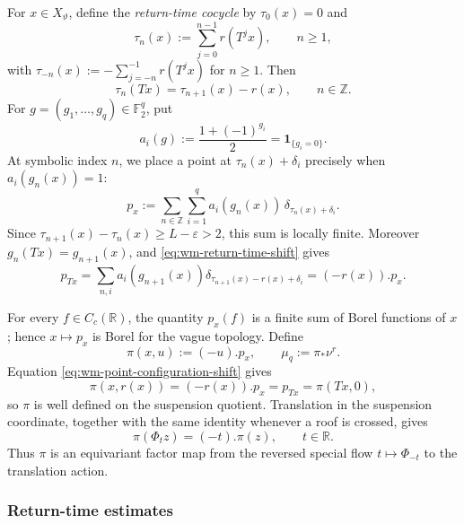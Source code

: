 \documentclass[11pt,reqno,a4paper]{amsart}
\numberwithin{equation}{section}
\theoremstyle{compact}
\theoremstyle{definition}
\theoremstyle{definition}
\begin{document}
For $x\in X_\vartheta$, define the \emph{return-time cocycle} by
$\tau_0(x)=0$ and
\begin{equation}\label{eq:wm-return-time-cocycle}
  \tau_n(x):=\sum_{j=0}^{n-1}r(T^jx),
  \qquad n\geq1,
\end{equation}
with
$\tau_{-n}(x):=-\sum_{j=-n}^{-1}r(T^jx)$ for $n\geq1$.  Then
\begin{equation}\label{eq:wm-return-time-shift}
  \tau_n(Tx)=\tau_{n+1}(x)-r(x),
  \qquad n\in\mathbb Z.
\end{equation}
For $g=(g_1,\ldots,g_q)\in\mathbb F_2^q$, put
\begin{equation}\label{eq:wm-occupancy-indicator}
  a_i(g):=\frac{1+(-1)^{g_i}}2=\mathbf 1_{\{g_i=0\}}.
\end{equation}
At symbolic index $n$, we place a point at $\tau_n(x)+\delta_i$ precisely
when $a_i(g_n(x))=1$:
\begin{equation}\label{eq:wm-point-configuration}
  p_x
  :=\sum_{n\in\mathbb Z}\sum_{i=1}^q
     a_i(g_n(x))\,\delta_{\tau_n(x)+\delta_i}.
\end{equation}
Since $\tau_{n+1}(x)-\tau_n(x)\geq L-\varepsilon>2$, this sum is locally
finite.  Moreover $g_n(Tx)=g_{n+1}(x)$, and
\eqref{eq:wm-return-time-shift} gives
\begin{equation}\label{eq:wm-point-configuration-shift}
  p_{Tx}
  =\sum_{n,i}a_i(g_{n+1}(x))
     \delta_{\tau_{n+1}(x)-r(x)+\delta_i}
  =(-r(x)).p_x.
\end{equation}

For every $f\in C_c(\mathbb R)$, the quantity $p_x(f)$ is a finite sum of
Borel functions of $x$; hence $x\mapsto p_x$ is Borel for the vague
topology.  Define
\begin{equation}\label{eq:wm-suspension-factor-map}
  \pi(x,u):=(-u).p_x,
  \qquad
  \mu_q:=\pi_*\nu^r.
\end{equation}
Equation \eqref{eq:wm-point-configuration-shift} gives
\[
  \pi(x,r(x))=(-r(x)).p_x=p_{Tx}=\pi(Tx,0),
\]
so $\pi$ is well defined on the suspension quotient.  Translation in the
suspension coordinate, together with the same identity whenever a roof is
crossed, gives
\begin{equation}\label{eq:wm-factor-anti-equivariance}
  \pi(\Phi_t z)=(-t).\pi(z),
  \qquad t\in\mathbb R.
\end{equation}
Thus $\pi$ is an equivariant factor map from the reversed special flow
$t\mapsto\Phi_{-t}$ to the translation action.

\subsubsection{Return-time estimates}
\end{document}
